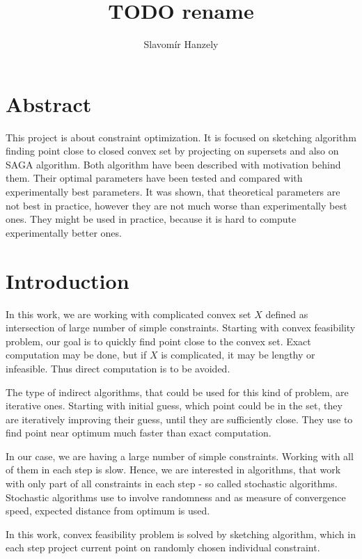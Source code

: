 \documentclass[11pt]{book}
\begin{document}
\title{\textbf{TODO rename}}
\author{Slavomír Hanzely}
\maketitle

\chapter*{\centering Abstract}

This project is about constraint optimization. It is focused on sketching algorithm finding point close to closed convex set by projecting on supersets and also on SAGA algorithm. Both algorithm have been described with motivation behind them. Their optimal parameters have been tested and compared with experimentally best parameters. It was shown, that theoretical parameters are not best in practice, however they are not much worse than experimentally best ones. They might be used in practice, because it is hard to compute experimentally better ones.

\tableofcontents

\chapter{Introduction}

In this work, we are working with complicated convex set $X$ defined as intersection of large number of simple constraints. Starting with convex feasibility problem, our goal is to quickly find point close to the convex set. Exact computation may be done, but if $X$ is complicated, it may be lengthy or infeasible. Thus direct computation is to be avoided.

The type of indirect algorithms, that could be used for this kind of problem, are iterative ones. Starting with initial guess, which point could be in the set, they are iteratively improving their guess, until they are sufficiently close. They use to find point near optimum much faster than exact computation.

In our case, we are having a large number of simple constraints. Working with all of them in each step is slow. Hence, we are interested in algorithms, that work with only part of all constraints in each step - so called stochastic algorithms. Stochastic algorithms use to involve randomness and as measure of convergence speed, expected distance from optimum is used.

In this work, convex feasibility problem is solved by sketching algorithm, which in each step project current point on randomly chosen individual constraint.\\
\end{document}
